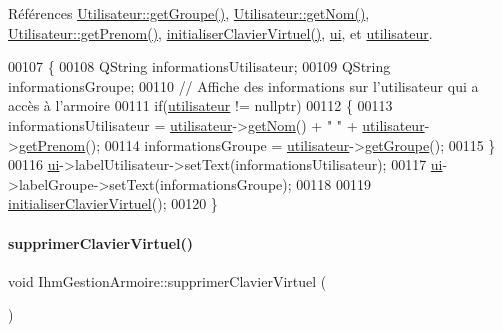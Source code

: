 Références \hyperlink{class_utilisateur_a9922d48c4d295c9357ad8102399322ec}{Utilisateur\+::get\+Groupe()}, \hyperlink{class_utilisateur_adfffec2519ba338497de55b61e7bc420}{Utilisateur\+::get\+Nom()}, \hyperlink{class_utilisateur_ac4483808ad54888c66a4235133d135d5}{Utilisateur\+::get\+Prenom()}, \hyperlink{class_ihm_gestion_armoire_a189ab3f034720597eedf3930631e6dd1}{initialiser\+Clavier\+Virtuel()}, \hyperlink{class_ihm_gestion_armoire_a793a2816dc21b3161566138d2af5a8b9}{ui}, et \hyperlink{class_ihm_gestion_armoire_aa14adf3863cf09947411fc33e413076c}{utilisateur}.


\begin{DoxyCode}
00107 \{
00108     QString informationsUtilisateur;
00109     QString informationsGroupe;
00110     \textcolor{comment}{// Affiche des informations sur l'utilisateur qui a accès à l'armoire}
00111     \textcolor{keywordflow}{if}(\hyperlink{class_ihm_gestion_armoire_aa14adf3863cf09947411fc33e413076c}{utilisateur} != \textcolor{keyword}{nullptr})
00112     \{
00113         informationsUtilisateur = \hyperlink{class_ihm_gestion_armoire_aa14adf3863cf09947411fc33e413076c}{utilisateur}->\hyperlink{class_utilisateur_adfffec2519ba338497de55b61e7bc420}{getNom}() + \textcolor{stringliteral}{" "} + 
      \hyperlink{class_ihm_gestion_armoire_aa14adf3863cf09947411fc33e413076c}{utilisateur}->\hyperlink{class_utilisateur_ac4483808ad54888c66a4235133d135d5}{getPrenom}();
00114         informationsGroupe = \hyperlink{class_ihm_gestion_armoire_aa14adf3863cf09947411fc33e413076c}{utilisateur}->\hyperlink{class_utilisateur_a9922d48c4d295c9357ad8102399322ec}{getGroupe}();
00115     \}
00116     \hyperlink{class_ihm_gestion_armoire_a793a2816dc21b3161566138d2af5a8b9}{ui}->labelUtilisateur->setText(informationsUtilisateur);
00117     \hyperlink{class_ihm_gestion_armoire_a793a2816dc21b3161566138d2af5a8b9}{ui}->labelGroupe->setText(informationsGroupe);
00118 
00119     \hyperlink{class_ihm_gestion_armoire_a189ab3f034720597eedf3930631e6dd1}{initialiserClavierVirtuel}();
00120 \}
\end{DoxyCode}
\mbox{\label{class_ihm_gestion_armoire_ac82ab8c9ad48f26ab928b7a72e4dcee0}} 
\paragraph{\texorpdfstring{supprimer\+Clavier\+Virtuel()}{supprimerClavierVirtuel()}}
{\footnotesize\ttfamily void Ihm\+Gestion\+Armoire\+::supprimer\+Clavier\+Virtuel (\begin{DoxyParamCaption}{ }\end{DoxyParamCaption})\hspace{0.3cm}{\ttfamily [private]}}



